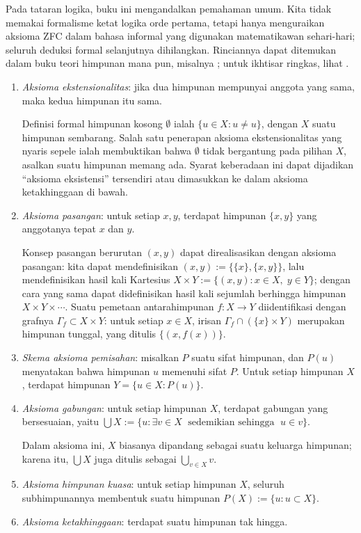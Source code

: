 Pada tataran logika, buku ini mengandalkan pemahaman umum. Kita tidak memakai formalisme ketat logika orde pertama, tetapi hanya menguraikan aksioma ZFC dalam bahasa informal yang digunakan matematikawan sehari-hari; seluruh deduksi formal selanjutnya dihilangkan. Rinciannya dapat ditemukan dalam buku teori himpunan mana pun, misalnya \cite{Je03,HY14}; untuk ikhtisar ringkas, lihat \cite{sep-set-theory}.
\begin{enumerate}[\bfseries {A}.1]
	\item \emph{Aksioma ekstensionalitas}: jika dua himpunan mempunyai anggota yang sama, maka kedua himpunan itu sama.

		Definisi formal himpunan kosong $\emptyset$ ialah $\{u \in X: u \neq u\}$, dengan $X$ suatu himpunan sembarang. Salah satu penerapan aksioma ekstensionalitas yang nyaris sepele ialah membuktikan bahwa $\emptyset$ tidak bergantung pada pilihan $X$, asalkan suatu himpunan memang ada. Syarat keberadaan ini dapat dijadikan ``aksioma eksistensi'' tersendiri atau dimasukkan ke dalam aksioma ketakhinggaan di bawah.
	\item \emph{Aksioma pasangan}: untuk setiap $x,y$, terdapat himpunan $\{x,y\}$ yang anggotanya tepat $x$ dan $y$.
	
		Konsep pasangan berurutan $(x,y)$ dapat direalisasikan dengan aksioma pasangan: kita dapat mendefinisikan $(x,y) := \{\{x\}, \{x,y\} \}$, lalu mendefinisikan hasil kali Kartesius $X \times Y := \{(x,y) : x \in X,\; y \in Y \}$; dengan cara yang sama dapat didefinisikan hasil kali sejumlah berhingga himpunan $X \times Y \times \cdots$. Suatu pemetaan antarahimpunan $f: X \to Y$ diidentifikasi dengan grafnya $\Gamma_f \subset X \times Y$: untuk setiap $x \in X$, irisan $\Gamma_f \cap (\{x\} \times Y)$ merupakan himpunan tunggal, yang ditulis $\{(x, f(x))\}$.
	\item \emph{Skema aksioma pemisahan}: misalkan $P$ suatu sifat himpunan, dan $P(u)$ menyatakan bahwa himpunan $u$ memenuhi sifat $P$. Untuk setiap himpunan $X$, terdapat himpunan $Y = \{u \in X : P(u) \}$.
	\item \emph{Aksioma gabungan}: untuk setiap himpunan $X$, terdapat gabungan yang bersesuaian, yaitu $\bigcup X := \{u : \exists v \in X \; \text{ sedemikian sehingga }\; u \in v\}$.
	
		Dalam aksioma ini, $X$ biasanya dipandang sebagai suatu keluarga himpunan; karena itu, $\bigcup X$ juga ditulis sebagai $\bigcup_{v \in X} v$.
	\item \emph{Aksioma himpunan kuasa}: untuk setiap himpunan $X$, seluruh subhimpunannya membentuk suatu himpunan $P(X) := \{u : u \subset X \}$.
	\item \emph{Aksioma ketakhinggaan}: terdapat suatu himpunan tak hingga.


\end{enumerate}
